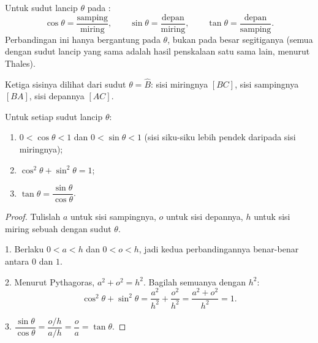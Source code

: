 \begin{definition}\label{def:g9:trig:ratios}
Untuk sudut lancip $\theta$ pada :
\[
\cos\theta = \frac{\text{samping}}{\text{miring}},
\qquad
\sin\theta = \frac{\text{depan}}{\text{miring}},
\qquad
\tan\theta = \frac{\text{depan}}{\text{samping}} .
\]
Perbandingan ini hanya
bergantung pada $\theta$, bukan pada besar segitiganya (semua  dengan sudut lancip yang sama adalah hasil penskalaan satu
sama lain, menurut Thales).
\end{definition}

\begin{omfigure}

{\small Ketiga sisinya dilihat dari sudut $\theta = \widehat B$: sisi
miringnya $[BC]$, sisi sampingnya $[BA]$, sisi depannya $[AC]$.}
\end{omfigure}

\begin{proposition}\label{prop:g9:trig:properties}
Untuk setiap sudut lancip $\theta$:
\begin{enumerate}
  \item $0 < \cos\theta < 1$ dan $0 < \sin\theta < 1$ (sisi siku-siku
        lebih pendek daripada sisi miringnya);
  \item $\cos^2\theta + \sin^2\theta = 1$;
  \item $\tan\theta = \dfrac{\sin\theta}{\cos\theta}$.
\end{enumerate}
\end{proposition}

\begin{proof}
Tulislah $a$ untuk sisi sampingnya, $o$ untuk sisi depannya, $h$ untuk
sisi miring sebuah  dengan sudut $\theta$.

1. Berlaku $0 < a < h$ dan $0 < o < h$, jadi kedua perbandingannya
benar-benar antara $0$ dan $1$.

2. Menurut Pythagoras, $a^2 + o^2 = h^2$. Bagilah semuanya dengan $h^2$:
\[
\cos^2\theta + \sin^2\theta
= \frac{a^2}{h^2} + \frac{o^2}{h^2}
= \frac{a^2 + o^2}{h^2} = 1 .
\]

3. $\dfrac{\sin\theta}{\cos\theta} = \dfrac{o/h}{a/h} = \dfrac oa
= \tan\theta$.
\end{proof}

